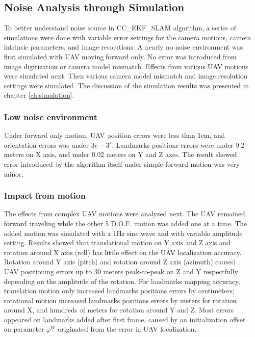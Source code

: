 \subsection{Noise Analysis through Simulation}
To better understand noise source in CC\_EKF\_SLAM algorithm, a series
of simulations were done with variable error settings for the camera
motions, camera intrinsic parameters, and image resolutions. A nearly
no noise environment was first simulated with UAV moving forward only.
No error was introduced from image digitization or camera model
mismatch. Effects from various UAV motions were simulated next. Then
various camera model mismatch and image resolution settings were
simulated. The discussion of the simulation results was presented in
chapter \ref{ch:simulation}.

\subsubsection{Low noise environment}
Under forward only motion, UAV position errors were less than 1cm, and
orientation errors was under $3e-3^\circ$. Landmarks positions errors
were under 0.2 meters on X axis, and under 0.02 meters on Y and
Z axes. The result showed error introduced by the algorithm
itself under simple forward motion was very minor.

\subsubsection{Impact from motion}
The effects from complex UAV motions were analyzed next. The UAV
remained forward traveling while the other 5 D.O.F. motion was added
one at a time. The added motion was simulated with a 1Hz sine wave and
with variable amplitude setting. Results showed that translational
motion on Y axis and Z axis and rotation around X axis (roll) has
little effect on the UAV localization accuracy. Rotation around Y axis
(pitch) and rotation around Z axis (azimuth) caused UAV positioning
errors up to 30 meters peak-to-peak on Z and Y respectfully depending
on the amplitude of the rotation. For landmarks  mapping accuracy,
translation motion only increased landmarks positions errors by
centimeters; rotational motion increased landmarks positions errors by
meters for rotation around X, and hundreds of meters for rotation
around Y and Z. Most errors appeared on landmarks added after first frame,
caused by an initialization offset on parameter $\varphi^W$ originated
from the error in UAV localization.

